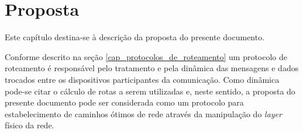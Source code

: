 \chapter{Proposta}
Este capítulo destina-se à descrição da proposta do presente documento.

Conforme descrito na seção \ref{cap_protocolos_de_roteamento} um protocolo de roteamento é responsável pelo tratamento e pela dinâmica das mensagens e dados trocados entre os dispositivos participantes da comunicação. Como dinâmica pode-se citar o cálculo de rotas a serem utilizadas e, neste sentido, a proposta do presente documento pode ser considerada como um protocolo para estabelecimento de caminhos ótimos de rede através da manipulação do \emph{layer} físico da rede.

